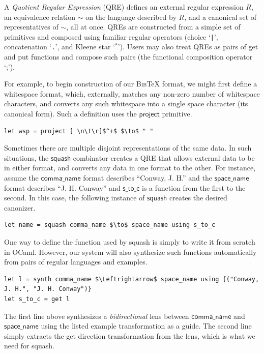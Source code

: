 \documentclass[acmsmall,review,anonymous]{acmart}
\newcommand{\kw}[1]{\ensuremath{\mathsf{#1}}}
\newcommand{\codefont}[1]{\ensuremath{\mathsf{#1}}}
\newcommand{\bibtex}{\textsc{Bib}\TeX{}}
\newcommand{\cd}[1]{\lstinline[backgroundcolor=\color{white}]$#1$}
\begin{document}
A {\em Quotient Regular Expression} (QRE) defines an external regular
expression $R$, an equivalence relation $\sim$ on the language
described by $R$, and a canonical set of representatives of $\sim$,
all at once.  QREs are constructed from a simple set of primitives
and composed using familiar regular operators
(choice `\cd{|}', concatenation `\cd{.}',
and Kleene star `$^*$').  Users may also treat QREs as pairs of
get and put functions and compose such pairs (the functional
composition operator `;').

For example, to begin construction of our \bibtex{} format, we might
first define a whitespace format, which, externally, matches
any non-zero number of whitespace characters, and converts
any such whitespace into a single space character (its canonical form).
Such a definition uses the \kw{project} primitive.

\begin{lstlisting}
let wsp = project [ \n\t\r]$^+$ $\to$ " "
\end{lstlisting}

Sometimes there are multiple disjoint representations of the same data.
In such situations, the \kw{squash} combinator creates a QRE that
allows external data to be in either format, and converts any
data in one format to the other.
For instance, assume
the \codefont{comma\_name} format describes ``Conway, J. H.''
and the \codefont{space\_name} format describes ``J. H. Conway''
and \codefont{s\_to\_c} is a function from the first to the second.  In this case,
the following instance of \kw{squash} creates the desired canonizer.


\begin{lstlisting}
let name = squash comma_name $\to$ space_name using s_to_c
\end{lstlisting}

One way to define the function used by squash is simply to write it
from scratch in OCaml.  However, our system will also synthesize
such functions automatically from pairs of regular languages and
examples.
%
\begin{lstlisting}
let l = synth comma_name $\Leftrightarrow$ space_name using {("Conway, J. H.", "J. H. Conway")}
let s_to_c = get l
\end{lstlisting}
%
The first line above synthesizes a \emph{bidirectional} lens between
\codefont{comma\_name} and \codefont{space\_name} using the listed example
transformation as a guide.  The second line simply
extracts the get direction transformation from the lens,
which is what we need for squash.
\end{document}
